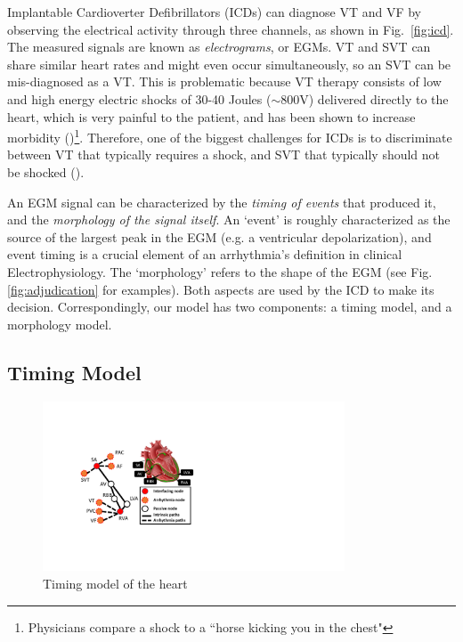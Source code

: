 Implantable Cardioverter Defibrillators (ICDs) can diagnose VT and VF by observing the electrical activity through three channels, as shown in Fig.~\ref{fig:icd}.
The measured signals are known as \emph{electrograms}, or EGMs.
VT and SVT can share similar heart rates and might even occur simultaneously, so an SVT can be mis-diagnosed as a VT. 
This is problematic because VT therapy consists of low and high energy electric shocks of 30-40 Joules ($\sim$800V) delivered directly to the heart, which is very painful to the patient, and has been shown to increase morbidity (\cite{shock_mortality})\footnote{\small{Physicians compare a shock to a ``horse kicking you in the chest"}}.
Therefore, one of the biggest challenges for ICDs is to discriminate between VT that typically requires a shock, and SVT that typically should not be shocked (\cite{Ellenbogen11_Pacingbook}).

An EGM signal can be characterized by the \emph{timing of events} that produced it, and the \emph{morphology of the signal itself}.
An `event' is roughly characterized as the source of the largest peak in the EGM (e.g. a ventricular depolarization), and event timing is a crucial element of an arrhythmia's definition in clinical Electrophysiology.
The `morphology' refers to the shape of the EGM (see Fig. \ref{fig:adjudication} for examples).
Both aspects are used by the ICD to make its decision.
Correspondingly, our model has two components: a timing model, and a morphology model.

\subsection{Timing Model}
\begin{figure}[t]
	\centering
	\includegraphics[width=0.8\textwidth]{figs/HM_top.pdf}
	\caption{\small Timing model of the heart}
	\label{fig:HM_top}
\end{figure}

